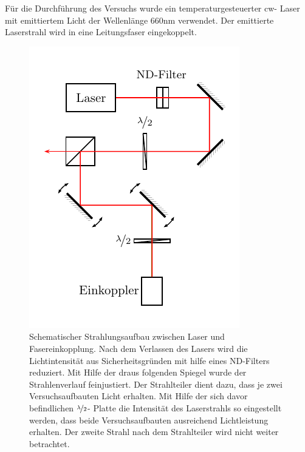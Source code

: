 
Für die Durchführung des Versuchs wurde ein temperaturgesteuerter cw- Laser mit emittiertem Licht der Wellenlänge 660nm verwendet. Der emittierte Laserstrahl wird in eine Leitungsfaser eingekoppelt.

\begin{figure}[h]
	\centering
	\includegraphics[width=0.5\linewidth]{graphs/versuchsaufbau/lasereinheit.pdf}
	\caption[Schematischer Aufbau Lasereinheit]{
		Schematischer Strahlungsaufbau zwischen Laser und Fasereinkopplung. Nach dem Verlassen des Lasers wird die Lichtintensität aus Sicherheitsgründen mit hilfe eines ND-Filters reduziert. Mit Hilfe der draus folgenden Spiegel wurde der Strahlenverlauf feinjustiert. Der Strahlteiler dient dazu, dass je zwei Versuchsaufbauten Licht erhalten. Mit Hilfe der sich davor befindlichen $\nicefrac{\lambda}{2}$- Platte die Intensität des Laserstrahls so eingestellt werden, dass beide Versuchsaufbauten ausreichend Lichtleistung erhalten. Der zweite Strahl nach dem Strahlteiler wird nicht weiter betrachtet.
	}
	\label{fig:lasereinheit}
\end{figure}

